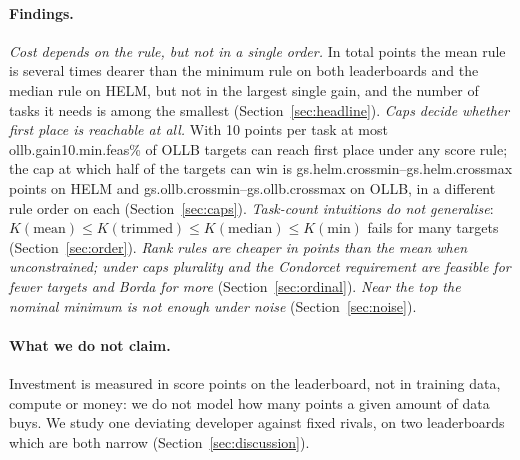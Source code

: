 \paragraph{Findings.}
\emph{Cost depends on the rule, but not in a single order.} In total points the mean rule is several times dearer than the minimum rule on both leaderboards and the median rule on HELM, but not in the largest single gain, and the number of tasks it needs is among the smallest (Section~\ref{sec:headline}).
\emph{Caps decide whether first place is reachable at all.} With 10 points per task at most \num{ollb.gain10.min.feas}\% of OLLB targets can reach first place under any score rule; the cap at which half of the targets can win is \num{gs.helm.crossmin}--\num{gs.helm.crossmax} points on HELM and \num{gs.ollb.crossmin}--\num{gs.ollb.crossmax} on OLLB, in a different rule order on each (Section~\ref{sec:caps}).
\emph{Task-count intuitions do not generalise}: $K(\text{mean}) \le K(\text{trimmed}) \le K(\text{median}) \le K(\text{min})$ fails for many targets (Section~\ref{sec:order}).
\emph{Rank rules are cheaper in points than the mean when unconstrained; under caps plurality and the Condorcet requirement are feasible for fewer targets and Borda for more} (Section~\ref{sec:ordinal}).
\emph{Near the top the nominal minimum is not enough under noise} (Section~\ref{sec:noise}).

\paragraph{What we do not claim.}
Investment is measured in score points on the leaderboard, not in training data, compute or money: we do not model how many points a given amount of data buys. We study one deviating developer against fixed rivals, on two leaderboards which are both narrow (Section~\ref{sec:discussion}).
